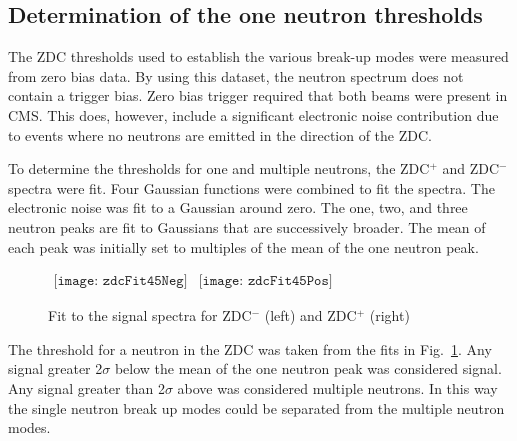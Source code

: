     \subsection{Determination of the one neutron thresholds}
      The ZDC thresholds used to establish the various break-up modes were 
        measured from zero bias data.
      By using this dataset, the neutron spectrum does not contain a trigger 
        bias. 
      Zero bias trigger required that both beams were present in CMS.
      This does, however, include a significant electronic noise contribution due
        to events where no neutrons are emitted in the direction of the ZDC.

      To determine the thresholds for one and multiple neutrons, the ZDC$^{+}$ 
        and ZDC$^{-}$ spectra were fit.
      Four Gaussian functions were combined to fit the spectra. 
      The electronic noise was fit to a Gaussian around zero.
      The one, two, and three neutron peaks are fit to Gaussians that are 
        successively broader.
      The mean of each peak was initially set to multiples of the mean of the 
        one neutron peak. 
      \begin{figure}[!Hh]
        \centering
        $ 
          \begin{array}{cc}
            \texttt{[image: zdcFit45Neg]} &
            \texttt{[image: zdcFit45Pos]}
          \end{array} 
        $
        \caption{Fit to the signal spectra for ZDC$^{-}$ (left) and ZDC$^{+}$ 
          (right)}
        \label{fig:zdcM2Fit}
      \end{figure}
      The threshold for a neutron in the ZDC was taken from the fits in 
        Fig.~\ref{fig:zdcM2Fit}.
      Any signal greater 2$\sigma$ below the mean of the one neutron peak was 
        considered signal.
      Any signal greater than 2$\sigma$ above was considered multiple 
        neutrons.
      In this way the single neutron break up modes could be separated from the
        multiple neutron modes.

